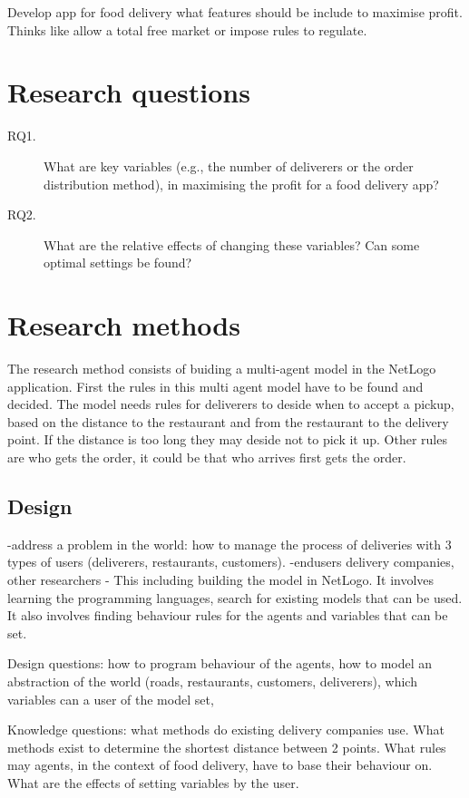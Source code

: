 Develop app for food delivery what features should be include to maximise profit.
Thinks like allow a total free market or impose rules to regulate.



\section{Research questions}

\begin{description}
    \item[RQ1.] What are key variables (e.g., the number of deliverers or the order distribution method), in maximising the profit for a food delivery app?
    \item[RQ2.] What are the relative effects of changing these variables? Can some optimal settings be found?
\end{description}

\section{Research methods}
The research method consists of buiding a multi-agent model in the NetLogo application.
First the rules in this multi agent model have to be found and decided.
The model needs rules for deliverers to deside when to accept a pickup, based on the distance to the restaurant and from the restaurant to the delivery point.
If the distance is too long they may deside not to pick it up.
Other rules are who gets the order, it could be that who arrives first gets the order.

\subsection{Design}
-address a problem in the world: how to manage the process of deliveries with 3 types of users (deliverers, restaurants, customers).
-endusers delivery companies, other researchers
-
This including building the model in NetLogo.
It involves learning the programming languages, search for existing models that can be used.
It also involves finding behaviour rules for the agents and variables that can be set.

Design questions: how to program behaviour of the agents, how to model an abstraction of the world (roads, restaurants, customers, deliverers),
which variables can a user of the model set,

Knowledge questions: what methods do existing delivery companies use.
What methods exist to determine the shortest distance between 2 points.
What rules may agents, in the context of food delivery, have to base their behaviour on.
What are the effects of setting variables by the user.

